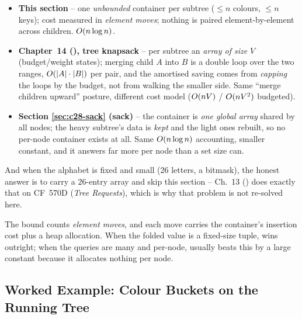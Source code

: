 \begin{comparisonbox}
\begin{itemize}[nosep,leftmargin=1.4em]
  \item \textbf{This section} -- one \emph{unbounded} container per subtree
        (\(\le n\) colours, \(\le n\) keys); cost measured in \emph{element
        moves}; nothing is paired element-by-element across children.
        \(O(n\log n)\).
  \item \textbf{Chapter~14 (), tree knapsack} -- per subtree an
        \emph{array of size} \(V\) (budget/weight states); merging child \(A\)
        into \(B\) is a double loop over the two ranges, \(O(|A|\cdot|B|)\)
        per pair, and the amortised saving comes from \emph{capping} the loops
        by the budget, not from walking the smaller side.  Same
        ``merge children upward'' posture, different cost model
        (\(O(nV)\) / \(O(nV^2)\) budgeted).
  \item \textbf{Section \ref{sec:c28-sack} (sack)} -- the container is
        \emph{one global array} shared by all nodes; the heavy subtree's data
        is \emph{kept} and the light ones rebuilt, so no per-node container
        exists at all.  Same \(O(n\log n)\) accounting, smaller constant,
        and it answers far more per node than a set size can.
\end{itemize}
And when the alphabet is fixed and small (26 letters, a bitmask), the honest
answer is to carry a \(26\)-entry array and skip this section -- Ch.~13
() does exactly that on CF~570D (\emph{Tree Requests}), which is
why that problem is not re-solved here.
\end{comparisonbox}

\begin{warningbox}
The bound counts \emph{element moves}, and each move carries the container's
insertion cost plus a heap allocation.  When the folded value is a fixed-size
tuple,  wins outright; when the queries are many
and per-node,  usually beats this by a large constant because
it allocates nothing per node.
\end{warningbox}

\subsection{Worked Example: Colour Buckets on the Running Tree}

